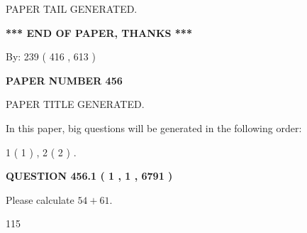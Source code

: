 \documentclass[12pt]{article}
\begin{document}
   
   
\vspace{2.0in} PAPER TAIL GENERATED.
   
   
   
   
\vspace{1.0in} 
{\textbf{\large{ *** END OF PAPER, THANKS *** }}} 
   
   
\hspace{1.0in} By: 
 239 ( 416 ,  613 )
   
   
   
   
\newpage 
\setcounter{page}{ 
   456001 } 
   
   
   
   
 {\textbf{ \Large{ PAPER NUMBER  456  }}}
   
   
\vspace{0.2in}
   
   
   
   
   
   
   
   
 \vspace{0.2in}
 
 
 
 
   
   
 PAPER TITLE GENERATED.
   
   
   
\vspace{0.2in}
   
In this paper, big questions will be generated in the following order: 
   
   
   1 ( 1 )
 ,
   2 ( 2 )
 .
  
\vspace{0.2in}
  
{\textbf{\Large{QUESTION
456.1 
 ( 1 , 1 , 6791 )
}}}
  
  
 
Please calculate $ %
54 +  %
61 $.
 
 
 
\noindent{}
 
 

115
 
 
\noindent{}
 
 

 
 
 
\noindent{}
 
\end{document}
